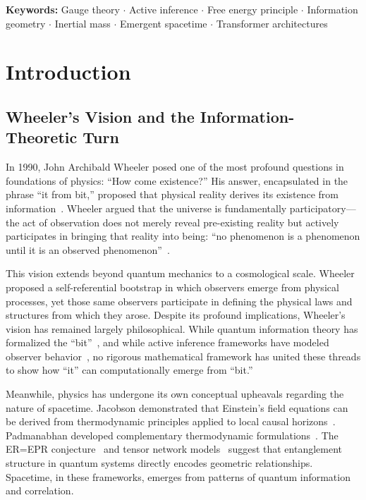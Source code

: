 \documentclass[11pt]{article}
\begin{document}
\noindent\textbf{Keywords:} Gauge theory $\cdot$ Active inference $\cdot$ Free energy principle $\cdot$ Information geometry $\cdot$ Inertial mass $\cdot$ Emergent spacetime $\cdot$ Transformer architectures

\section{Introduction}
\label{sec:intro}

\subsection{Wheeler's Vision and the Information-Theoretic Turn}

In 1990, John Archibald Wheeler posed one of the most profound questions in foundations of physics: ``How come existence?'' His answer, encapsulated in the phrase ``it from bit,'' proposed that physical reality derives its existence from information~\cite{Wheeler1990}. Wheeler argued that the universe is fundamentally participatory---the act of observation does not merely reveal pre-existing reality but actively participates in bringing that reality into being: ``no phenomenon is a phenomenon until it is an observed phenomenon''~\cite{Wheeler1983}.

This vision extends beyond quantum mechanics to a cosmological scale. Wheeler proposed a self-referential bootstrap in which observers emerge from physical processes, yet those same observers participate in defining the physical laws and structures from which they arose. Despite its profound implications, Wheeler's vision has remained largely philosophical. While quantum information theory has formalized the ``bit''~\cite{Shannon1948,CoverThomas2006}, and while active inference frameworks have modeled observer behavior~\cite{Friston2010,Friston2017}, no rigorous mathematical framework has united these threads to show how ``it'' can computationally emerge from ``bit.''

Meanwhile, physics has undergone its own conceptual upheavals regarding the nature of spacetime. Jacobson demonstrated that Einstein's field equations can be derived from thermodynamic principles applied to local causal horizons~\cite{Jacobson1995}. Padmanabhan developed complementary thermodynamic formulations~\cite{Padmanabhan2010}. The ER=EPR conjecture~\cite{MaldacenaSusskind2013} and tensor network models~\cite{Swingle2012} suggest that entanglement structure in quantum systems directly encodes geometric relationships. Spacetime, in these frameworks, emerges from patterns of quantum information and correlation.
\end{document}
